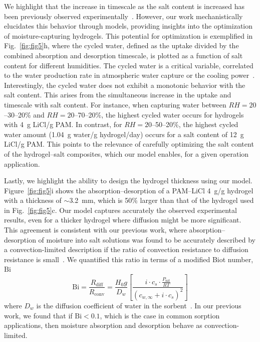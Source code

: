 \documentclass[11pt]{article}
\begin{document}
We highlight that the increase in timescale as the salt content is increased has been previously observed experimentally~\cite{guo2022,lu2022,guan2022b}. However, our work mechanistically elucidates this behavior through models, providing insights into the optimization of moisture-capturing hydrogels. This potential for optimization is exemplified in Fig.~\ref{fig:fig5}h, where the cycled water, defined as the uptake divided by the combined absorption and desorption timescale, is plotted as a function of salt content for different humidities. The cycled water is a critical variable, correlated to the water production rate in atmospheric water capture or the cooling power~\cite{li2020,wilson2023}. Interestingly, the cycled water does not exhibit a monotonic behavior with the salt content. This arises from the simultaneous increase in the uptake and timescale with salt content. For instance, when capturing water between $RH = 20$--30--20\% and $RH = 20$--70--20\%, the highest cycled water occurs for hydrogels with 4~g LiCl/g PAM. In contrast, for $RH = 20$--50--20\%, the highest cycled water amount (1.04~g water/g hydrogel/day) occurs for a salt content of 12~g LiCl/g PAM. This points to the relevance of carefully optimizing the salt content of the hydrogel--salt composites, which our model enables, for a given operation application.

Lastly, we highlight the ability to design the hydrogel thickness using our model. Figure~\ref{fig:fig5}i shows the absorption--desorption of a PAM--LiCl 4~g/g hydrogel with a thickness of $\sim$3.2~mm, which is 50\% larger than that of the hydrogel used in Fig.~\ref{fig:fig5}c. Our model captures accurately the observed experimental results, even for a thicker hydrogel where diffusion might be more significant. This agreement is consistent with our previous work, where absorption--desorption of moisture into salt solutions was found to be accurately described by a convection-limited description if the ratio of convection resistance to diffusion resistance is small~\cite{diazmarin2024a}. We quantified this ratio in terms of a modified Biot number, $\mathrm{Bi}$
\begin{equation}
\mathrm{Bi} = \frac{R_{\mathrm{diff}}}{R_{\mathrm{conv}}} = \frac{H_0 g}{D_w}\left[\frac{i \cdot c_s \cdot \frac{P_{\mathrm{sat}}}{RT}}{\left(c_{w,\infty} + i \cdot c_s\right)^2}\right]
\label{eq:10}
\end{equation}
where $D_w$ is the diffusion coefficient of water in the sorbent~\cite{graeber2024}. In our previous work, we found that if $\mathrm{Bi} < 0.1$, which is the case in common sorption applications, then moisture absorption and desorption behave as convection-limited.
\end{document}
